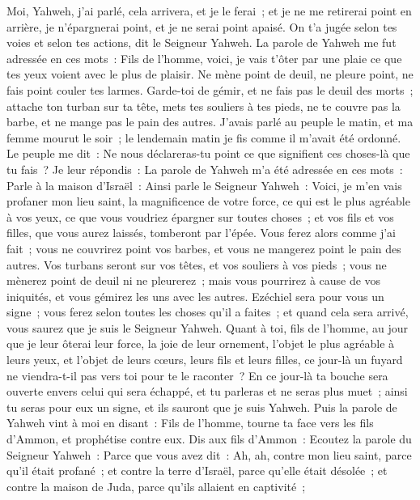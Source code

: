 \begin{multicols}{2}
Moi, Yahweh, j'ai parlé, cela arrivera, et je le ferai~; et je ne me retirerai point en arrière, je n'épargnerai point, et je ne serai point apaisé. On t'a jugée selon tes voies et selon tes actions, dit le Seigneur Yahweh.
La parole de Yahweh me fut adressée en ces mots~:
Fils de l'homme, voici, je vais t'ôter par une plaie ce que tes yeux voient avec le plus de plaisir. Ne mène point de deuil, ne pleure point, ne fais point couler tes larmes.
Garde-toi de gémir, et ne fais pas le deuil des morts~; attache ton turban sur ta tête, mets tes souliers à tes pieds, ne te couvre pas la barbe, et ne mange pas le pain des autres.
J'avais parlé au peuple le matin, et ma femme mourut le soir~; le lendemain matin je fis comme il m'avait été ordonné.
Le peuple me dit~: Ne nous déclareras-tu point ce que signifient ces choses-là que tu fais~?
Je leur répondis~: La parole de Yahweh m'a été adressée en ces mots~:
Parle à la maison d'Israël~: Ainsi parle le Seigneur Yahweh~: Voici, je m'en vais profaner mon lieu saint, la magnificence de votre force, ce qui est le plus agréable à vos yeux, ce que vous voudriez épargner sur toutes choses~; et vos fils et vos filles, que vous aurez laissés, tomberont par l'épée.
Vous ferez alors comme j'ai fait~; vous ne couvrirez point vos barbes, et vous ne mangerez point le pain des autres.
Vos turbans seront sur vos têtes, et vos souliers à vos pieds~; vous ne mènerez point de deuil ni ne pleurerez~; mais vous pourrirez à cause de vos iniquités, et vous gémirez les uns avec les autres. Ezéchiel sera pour vous un signe~; 
vous ferez selon toutes les choses qu'il a faites~; et quand cela sera arrivé, vous saurez que je suis le Seigneur Yahweh.
Quant à toi, fils de l'homme, au jour que je leur ôterai leur force, la joie de leur ornement, l'objet le plus agréable à leurs yeux, et l'objet de leurs cœurs, leurs fils et leurs filles,
ce jour-là un fuyard ne viendra-t-il pas vers toi pour te le raconter~?
En ce jour-là ta bouche sera ouverte envers celui qui sera échappé, et tu parleras et ne seras plus muet~; ainsi tu seras pour eux un signe, et ils sauront que je suis Yahweh.
\VerseOne{}Puis la parole de Yahweh vint à moi en disant~:
Fils de l'homme, tourne ta face vers les fils d'Ammon, et prophétise contre eux.
Dis aux fils d'Ammon~: Ecoutez la parole du Seigneur Yahweh~: Parce que vous avez dit~: Ah, ah, contre mon lieu saint, parce qu'il était profané~; et contre la terre d'Israël, parce qu'elle était désolée~; et contre la maison de Juda, parce qu'ils allaient en captivité~;

\end{multicols}
